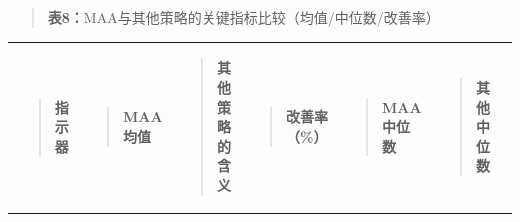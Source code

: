 \documentclass[UTF8]{ctexart}
\newcounter{none} %
\begin{document}
\begin{quote}
\textbf{表8：}MAA与其他策略的关键指标比较（均值/中位数/改善率）
\end{quote}

{\def\LTcaptype{none} %
\begin{longtable}[]{@{}
  >{\raggedright\arraybackslash}p{}
  >{\raggedright\arraybackslash}p{}
  >{\raggedright\arraybackslash}p{}
  >{\raggedright\arraybackslash}p{}
  >{\raggedright\arraybackslash}p{}
  >{\raggedright\arraybackslash}p{}
  >{\raggedright\arraybackslash}p{}@{}}
\toprule\noalign{}
\endhead
\bottomrule\noalign{}
\endlastfoot
\begin{minipage}[t]{\linewidth}\raggedright
\begin{quote}
\textbf{指示器}
\end{quote}
\end{minipage} & \begin{minipage}[t]{\linewidth}\raggedright
\begin{quote}
\textbf{MAA均值}
\end{quote}
\end{minipage} & \begin{minipage}[t]{\linewidth}\raggedright
\begin{quote}
\textbf{其他策略的含义}
\end{quote}
\end{minipage} & \begin{minipage}[t]{\linewidth}\raggedright
\begin{quote}
\textbf{改善率（\%）}
\end{quote}
\end{minipage} & \begin{minipage}[t]{\linewidth}\raggedright
\begin{quote}
\textbf{MAA中位数}
\end{quote}
\end{minipage} & \begin{minipage}[t]{\linewidth}\raggedright
\begin{quote}
\textbf{其他中位数}
\end{quote}
\end{minipage} & \begin{minipage}[t]{\linewidth}\raggedright

\end{minipage}
\end{longtable}}
\end{document}
